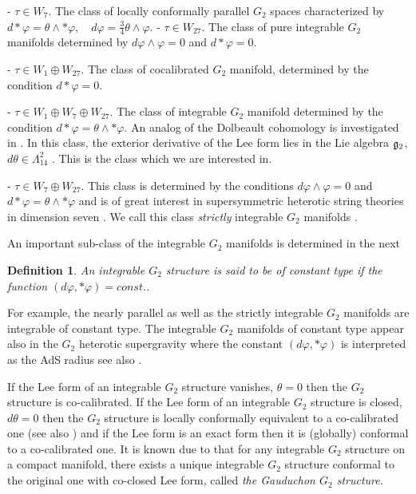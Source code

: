 \documentclass[10pt,british]{article}
\newtheorem{dfn}[thrm]{Definition}
\def\p{{\varphi}}
\begin{document}
\noindent - $\tau \in W_7$. The class of locally conformally parallel $G_2$ spaces characterized by
$d*\p=\theta\wedge *\p, \quad d\p=\frac34\theta\wedge\p$.
 - $\tau \in W_{27}$. The class of pure integrable  $G_2$ manifolds determined by  $d\p\wedge\p=0$ and $d*\p=0$.

\noindent - $\tau \in W_1\oplus W_{27}$. The class of cocalibrated $G_2$ manifold, 
determined by the condition $d*\p=0$. 
 
\noindent - $\tau \in W_1\oplus W_7\oplus W_{27}$. The class of integrable $G_2$ manifold determined by the condition $d*\p=\theta\wedge *\p$.  An analog of the Dolbeault cohomology is investigated in \cite{FUg}.  In this class, the exterior derivative of the Lee form lies in the Lie algebra $\frak{g}_2$, $d\theta\in \Lambda^2_{14}$ \cite{Kar1}. 
This is the  class which we are interested in.

 \noindent- $\tau \in W_7\oplus W_{27}$. This class is determined by the conditions $d\p\wedge\p=0$ and $d*\p=\theta\wedge*\p$ and is of great interest in supersymmetric heterotic string theories in dimension seven  \cite{GKMW,FI,FI1,GMW,GMPW,OLS}. We call this class \emph{strictly}  integrable   $G_2$ manifolds .

An important sub-class of the integrable $G_2$ manifolds is determined in the next
\begin{dfn}\label{ctype}
An integrable $G_2$ structure is said to be of constant type if the function $(d\p,*\p)=const.$.
\end{dfn}
For example, the nearly parallel as well as the strictly integrable $G_2$ manifolds are integrable of constant type. The integrable $G_2$ manifolds of constant type appear also in  the $G_2$ heterotic supergravity where  the constant  $(d\p,*\p)$ is interpreted as the AdS radius \cite{Oss1,Oss2} see also  \cite[Section~5.2.1]{AMP}.

If the Lee form of an integrable $G_2$ structure  vanishes, $\theta=0$ then the $G_2$ structure is
co-calibrated. If the Lee form of an integrable $G_2$ structure is closed,
$d\theta=0$ then the $G_2$ structure is locally conformally
equivalent to a co-calibrated one \cite{FI1} (see also \cite{Kar1}) and if the Lee form is an exact form then it is (globally) conformal to a co-calibrated one.  
It is known due to  \cite[Theorem~3.1]{FI1} that for any  integrable $G_2$ structure  on a compact manifold, there exists a unique integrable $G_2$ structure conformal to the original one with co-closed Lee form,  called \emph{the Gauduchon $G_2$ structure}.
\end{document}
